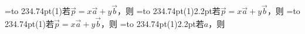 \documentclass[fontset=none]{ctexart}
\begin{document}
=\hbox to 234.74pt{\noindent(1)若\(\overrightarrow{p}=x\overrightarrow{a}+y\overrightarrow{b}\)，则\hfill}
=\hbox to 234.74pt{\noindent(1)\kern2.2pt若\(\overrightarrow{p}=x\overrightarrow{a}+y\overrightarrow{b}\)，则\hfill}
=\hbox to 234.74pt{\noindent(1)\hspace{2.2pt}若\(\overrightarrow{p}=x\overrightarrow{a}+y\overrightarrow{b}\)，则\hfill}
=\hbox to 234.74pt{\noindent(1)\kern2.2pt若\(a\)，则\hfill}
\end{document}
